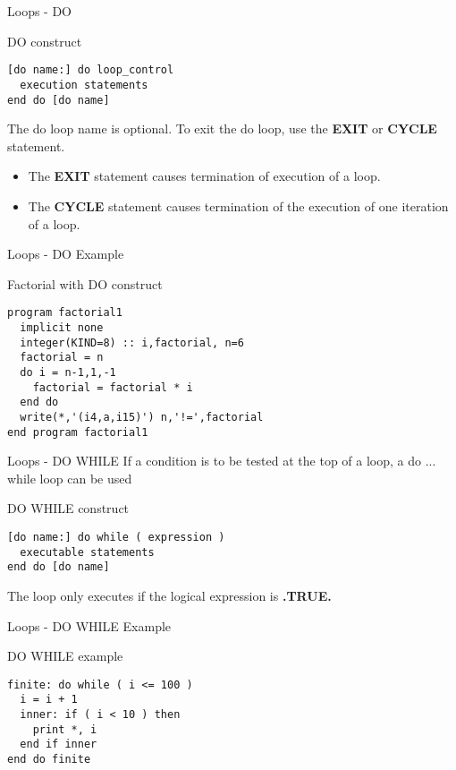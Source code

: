 \begin{frame}[fragile]{Loops - DO}
\begin{block}{DO construct}
\begin{lstlisting}
[do name:] do loop_control
  execution statements
end do [do name]
\end{lstlisting}
\end{block}
The do loop name is optional. To exit the do loop, use the \textbf{EXIT} 
or \textbf{CYCLE} statement.
\begin{itemize}
 \item The \textbf{EXIT} statement causes termination of execution of a loop.
 \item The \textbf{CYCLE} statement causes termination of the execution of one
iteration of a loop.
\end{itemize}
\end{frame}

\begin{frame}[fragile]{Loops - DO Example}
\begin{block}{Factorial with DO construct}
\begin{lstlisting}
program factorial1
  implicit none
  integer(KIND=8) :: i,factorial, n=6
  factorial = n
  do i = n-1,1,-1
    factorial = factorial * i
  end do
  write(*,'(i4,a,i15)') n,'!=',factorial
end program factorial1
\end{lstlisting}
\end{block}
\end{frame}

\begin{frame}[fragile]{Loops - DO WHILE}
If a condition is to be tested at the top of a loop, a do ... while
loop can be used
\begin{block}{DO WHILE construct}
\begin{lstlisting}
[do name:] do while ( expression )
  executable statements
end do [do name]
\end{lstlisting}
\end{block}
The loop only executes if the logical expression is \textbf{.TRUE.}
\end{frame}

\begin{frame}[fragile]{Loops - DO WHILE Example}
\begin{block}{DO WHILE example}
\begin{lstlisting}
finite: do while ( i <= 100 )
  i = i + 1
  inner: if ( i < 10 ) then
    print *, i
  end if inner
end do finite
\end{lstlisting}
\end{block}
\end{frame}